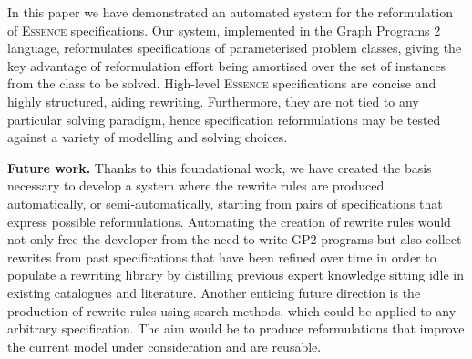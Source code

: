 \documentclass[a4paper,UKenglish,cleveref,pdfa]{lipics-v2021}
\newcommand{\essence}{\textsc{Essence}\xspace}
\begin{document}
In this paper we have demonstrated an automated system for the reformulation of \essence specifications. Our system, implemented in the Graph Programs 2 language, reformulates specifications of parameterised problem classes, giving the key advantage of reformulation effort being amortised over the set of instances from the class to be solved. 
High-level \essence specifications are concise and highly structured, aiding rewriting. Furthermore, they are not tied to any particular solving paradigm, hence specification reformulations may be tested against a variety of modelling and solving choices.

{\bf Future work.}
Thanks to this foundational work, we have created the basis necessary to develop a system where the rewrite rules are produced automatically, or semi-automatically, starting from pairs of specifications that express possible reformulations. Automating the creation of rewrite rules would not only free the developer from the need to write GP2 programs but also collect rewrites from past specifications that have been refined over time in order to populate a rewriting library by distilling previous expert knowledge sitting idle in existing catalogues and literature. Another enticing future direction is the production of rewrite rules using search methods, which could be applied to any arbitrary specification. The aim would be to produce reformulations that improve the current model under consideration and are reusable.


\end{document}
